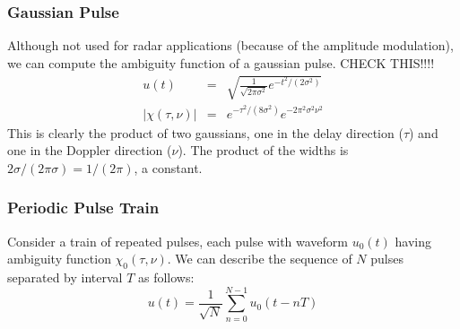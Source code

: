 \subsubsection{Gaussian Pulse}

Although not used for radar applications (because of the amplitude
modulation), we can compute the ambiguity function of a gaussian
pulse. CHECK THIS!!!!
\begin{eqnarray}
u(t) &=& \sqrt{\frac{1}{\sqrt{2\pi \sigma^2}} e^{-t^2/(2\sigma^2)}} \\
|\chi(\tau,\nu)| &=& e^{-\tau^2/(8\sigma^2)} e^{-2 \pi^2 \sigma^2 \nu^2}
\end{eqnarray}
This is clearly the product of two gaussians, one in the delay
direction ($\tau$) and one in the Doppler direction ($\nu$).  The
product of the widths is $2\sigma/(2\pi\sigma) = 1/(2\pi)$, a constant.

\subsubsection{Periodic Pulse Train}

Consider a train of repeated pulses, each pulse with waveform $u_0(t)$
having ambiguity function $\chi_0(\tau,\nu)$.  We can describe the
sequence of $N$ pulses separated by interval $T$ as follows:
\begin{equation}
u(t) = \frac{1}{\sqrt{N}} \sum_{n=0}^{N-1} u_0(t - nT)
\end{equation}

